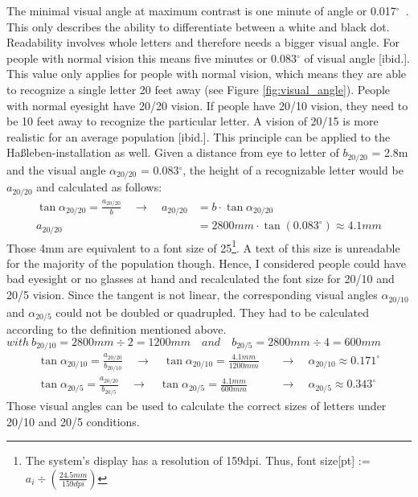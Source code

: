 The minimal visual angle at maximum contrast is one minute of angle or 0.017$^\circ$~\cite{SehwinkelLesbarkeit}. This only describes the ability to differentiate between a white and black dot. Readability involves whole letters and therefore needs a bigger visual angle. For people with normal vision this means five minutes or 0.083$^\circ$ of visual angle [ibid.]. This value only applies for people with normal vision, which means they are able to recognize a single letter 20 feet away (see Figure \ref{fig:visual_angle}). People with normal eyesight have 20/20 vision. If people have 20/10 vision, they need to be 10 feet away to recognize the particular letter. A vision of 20/15 is more realistic for an average population [ibid.]. This principle can be applied to the Haßleben-installation as well. Given a distance from eye to letter of $b_{20/20}$ = 2.8m and the visual angle $\alpha_{20/20}$ = 0.083$^\circ$, the height of a recognizable letter would be $a_{20/20}$ and calculated as follows:
\begin{align*}
	\tan{\alpha_{20/20}} = \frac{a_{20/20}}{b} \quad \to \quad a_{20/20} &= b \cdot \tan{\alpha_{20/20}}
	\\
	a_{20/20} &= 2800mm \cdot \tan{(0.083^\circ)} \approx 4.1mm
\end{align*}
Those 4mm are equivalent to a font size of 25\footnote{The system's display has a resolution of 159dpi. Thus, font size[pt] := $a_{i} \div{(\frac{24.5mm}{159dpi})}$}. A text of this size is unreadable for the majority of the population though. Hence, I considered people could have bad eyesight or no glasses at hand and recalculated the font size for 20/10 and 20/5 vision. Since the tangent is not linear, the corresponding visual angles $\alpha_{20/10}$ and $\alpha_{20/5}$ could not be doubled or quadrupled. They had to be calculated according to the definition mentioned above.
\\
$with \ b_{20/10} = 2800mm \div 2 = 1200mm \quad and \quad b_{20/5} = 2800mm \div 4 = 600mm$
\begin{align*}
	\tan{\alpha_{20/10}} = \frac{a_{20/20}}{b_{20/10}} \quad \to \quad \tan{\alpha_{20/10}} = \frac{4.1mm}{1200mm} \quad &\to \quad \alpha_{20/10} \approx 0.171^\circ
\\
	\tan{\alpha_{20/5}} = \frac{a_{20/20}}{b_{20/5}} \quad \to \quad \tan{\alpha_{20/5}} = \frac{4.1mm}{600mm} \quad &\to \quad \alpha_{20/5} \approx 0.343^\circ
\end{align*}
Those visual angles can be used to calculate the correct sizes of letters under 20/10 and 20/5 conditions.
